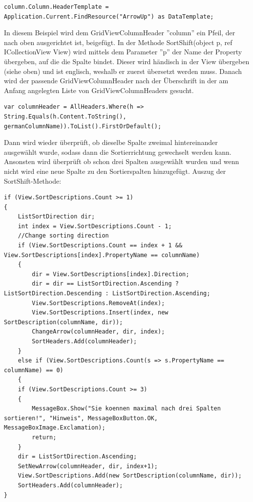 \begin{lstlisting}
column.Column.HeaderTemplate = Application.Current.FindResource("ArrowUp") as DataTemplate;
\end{lstlisting}
In diesem Beispiel wird dem GridViewColumnHeader ''column'' ein Pfeil, der nach oben ausgerichtet ist, beigefügt. \newline
In der Methode SortShift(object p, ref ICollectionView View) wird mittels dem Parameter ''p'' der Name der Property übergeben, auf die die Spalte bindet. Dieser wird händisch in der View übergeben (siehe oben) und ist englisch, weshalb er zuerst übersetzt werden muss. Danach wird der passende GridViewColumnHeader nach der Überschrift in der am Anfang angelegten Liste von GridViewColumnHeaders gesucht.
\begin{lstlisting}
var columnHeader = AllHeaders.Where(h => String.Equals(h.Content.ToString(), germanColumnName)).ToList().FirstOrDefault();
\end{lstlisting}
Dann wird wieder überprüft, ob dieselbe Spalte zweimal hintereinander ausgewählt wurde, sodass dann die Sortierrichtung gewechselt werden kann. Ansonsten wird überprüft ob schon drei Spalten ausgewählt wurden und wenn nicht wird eine neue Spalte zu den Sortierspalten hinzugefügt.
Auszug der SortShift-Methode:

\begin{lstlisting}
if (View.SortDescriptions.Count >= 1)
{
	ListSortDirection dir;
	int index = View.SortDescriptions.Count - 1;
	//Change sorting direction
	if (View.SortDescriptions.Count == index + 1 && View.SortDescriptions[index].PropertyName == columnName)
	{
		dir = View.SortDescriptions[index].Direction;
		dir = dir == ListSortDirection.Ascending ? ListSortDirection.Descending : ListSortDirection.Ascending;
		View.SortDescriptions.RemoveAt(index);
		View.SortDescriptions.Insert(index, new SortDescription(columnName, dir));
		ChangeArrow(columnHeader, dir, index);
		SortHeaders.Add(columnHeader);
	}
	else if (View.SortDescriptions.Count(s => s.PropertyName == columnName) == 0)
	{
	if (View.SortDescriptions.Count >= 3)
	{
		MessageBox.Show("Sie koennen maximal nach drei Spalten sortieren!", "Hinweis", MessageBoxButton.OK, MessageBoxImage.Exclamation);
		return;
	}
	dir = ListSortDirection.Ascending;
	SetNewArrow(columnHeader, dir, index+1);
	View.SortDescriptions.Add(new SortDescription(columnName, dir));
	SortHeaders.Add(columnHeader);
}
\end{lstlisting}
